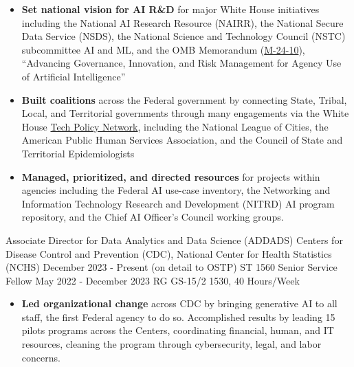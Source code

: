 \documentclass[]{scrartcl}
\begin{document}
\begin{cleanCV}
{\begin{itemize}
  \item \textbf{Set national vision for AI R\&D} for major White House initiatives including the National AI Research Resource (NAIRR), the National Secure Data Service (NSDS), the National Science and Technology Council (NSTC) subcommittee AI and ML, and the OMB Memorandum (\href{https://bidenwhitehouse.archives.gov/wp-content/uploads/2024/03/M-24-10-Advancing-Governance-Innovation-and-Risk-Management-for-Agency-Use-of-Artificial-Intelligence.pdf}{M-24-10}), ``Advancing Governance, Innovation, and Risk Management for Agency Use of Artificial Intelligence''
  \item \textbf{Built coalitions} across the Federal government by connecting State, Tribal, Local, and Territorial governments through many engagements via the White House \href{https://bidenwhitehouse.archives.gov/ostp/news-updates/2023/11/13/readout-of-roundtable-with-state-local-tribal-and-territorial-leaders-on-tech-policy/}{Tech Policy Network}, including the National League of Cities, the American Public Human Services Association, and the Council of State and Territorial Epidemiologists
  \item \textbf{Managed, prioritized, and directed resources} for projects within agencies including the Federal AI use-case inventory, the Networking and Information Technology Research and Development (NITRD) AI program repository, and the Chief AI Officer's Council working groups.

  \end{itemize}
}

\WorkExperience
{}
{Associate Director for Data Analytics and Data Science (ADDADS)}
{
  \newline Centers for Disease Control and Prevention (CDC), National Center for Health Statistics (NCHS)
  \newline December 2023 - Present (on detail to OSTP)
  \newline ST 1560
  \newline
  \newline Senior Service Fellow
  \newline May 2022 - December 2023
  \newline RG GS-15/2 1530, 40 Hours/Week
}
{
  \vspace{-0.25em}
  \begin{itemize}

  \item \textbf{Led organizational change} across CDC by bringing generative AI to all staff, the first Federal agency to do so. Accomplished results by leading 15 pilots programs across the Centers, coordinating financial, human, and IT resources, cleaning the program through cybersecurity, legal, and labor concerns.


\end{itemize}}
\end{cleanCV}
\end{document}
